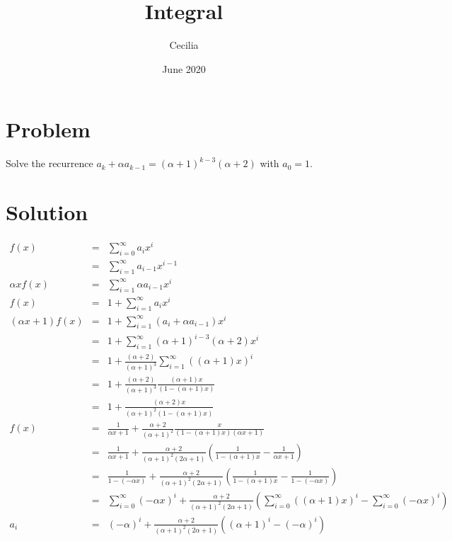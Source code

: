 \documentclass{article}
\title{Integral}
\author{Cecilia}
\date{June 2020}
\begin{document}
\maketitle

\section*{Problem}
Solve the recurrence $ a_k + \alpha a_{k-1} = (\alpha+1)^{k-3} (\alpha + 2) $ with $ a_0 = 1 $.

\section*{Solution}
\begin{eqnarray*}
                 f(x) &=& \sum\limits_{i=0}^{\infty} a_i x^i \\
                      &=& \sum\limits_{i=1}^{\infty} a_{i-1} x^{i-1} \\
        \alpha x f(x) &=& \sum\limits_{i=1}^{\infty} \alpha a_{i-1} x^i \\
                 f(x) &=& 1 + \sum\limits_{i=1}^{\infty} a_i x^i \\
  (\alpha x + 1) f(x) &=& 1 + \sum\limits_{i=1}^{\infty} (a_i + \alpha a_{i-1}) x^i \\
                      &=& 1 + \sum\limits_{i=1}^{\infty} (\alpha+1)^{i-3}(\alpha+2) x^i \\
                      &=& 1 + \frac{(\alpha+2)}{(\alpha+1)^3} \sum\limits_{i=1}^{\infty} ((\alpha+1)x)^i \\
                      &=& 1 + \frac{(\alpha+2)}{(\alpha+1)^3}\frac{(\alpha+1)x}{(1 - (\alpha+1)x)} \\
                      &=& 1 + \frac{(\alpha+2)x}{(\alpha+1)^2(1 - (\alpha+1)x)} \\
                 f(x) &=& \frac{1}{\alpha x + 1} + \frac{\alpha+2}{(\alpha+1)^2}\frac{x}{(1 - (\alpha+1)x)(\alpha x + 1)} \\
                      &=& \frac{1}{\alpha x + 1} + \frac{\alpha+2}{(\alpha+1)^2(2\alpha+1)}\left(\frac{1}{1 - (\alpha+1)x} - \frac{1}{\alpha x + 1}\right) \\
                      &=& \frac{1}{1 - (-\alpha x)} + \frac{\alpha+2}{(\alpha+1)^2(2\alpha+1)}\left(\frac{1}{1 - (\alpha+1)x} - \frac{1}{1 - (-\alpha x)}\right) \\
                      &=& \sum\limits_{i=0}^{\infty}(-\alpha x)^i + \frac{\alpha+2}{(\alpha+1)^2(2\alpha+1)}\left(\sum\limits_{i=0}^{\infty}((\alpha + 1)x)^i - \sum\limits_{i=0}^{\infty}(-\alpha x)^i\right) \\
                  a_i &=& (-\alpha)^i + \frac{\alpha+2}{(\alpha+1)^2(2\alpha+1)}\left((\alpha + 1)^i - (-\alpha)^i\right)
\end{eqnarray*}
\end{document}
